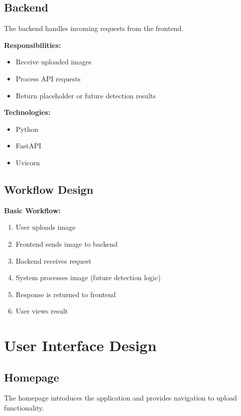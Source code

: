 \documentclass[12pt]{article}
\begin{document}
\subsection{Backend}

The backend handles incoming requests from the frontend.

\textbf{Responsibilities:}
\begin{itemize}[noitemsep]
    \item Receive uploaded images
    \item Process API requests
    \item Return placeholder or future detection results
\end{itemize}

\textbf{Technologies:}
\begin{itemize}[noitemsep]
    \item Python
    \item FastAPI
    \item Uvicorn
\end{itemize}

\subsection{Workflow Design}

\textbf{Basic Workflow:}
\begin{enumerate}[noitemsep]
    \item User uploads image
    \item Frontend sends image to backend
    \item Backend receives request
    \item System processes image (future detection logic)
    \item Response is returned to frontend
    \item User views result
\end{enumerate}

\section{User Interface Design}

\subsection{Homepage}

The homepage introduces the application and provides navigation to upload functionality.
\end{document}
